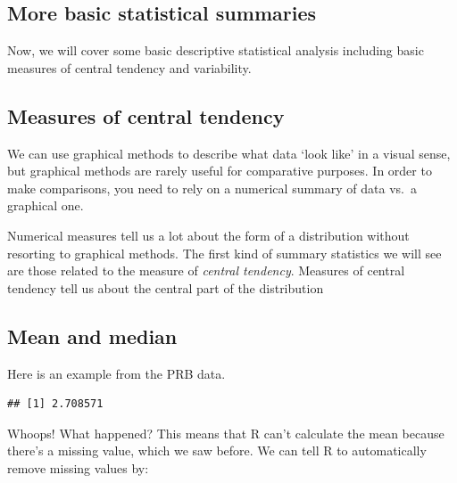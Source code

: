 \documentclass[
]{book}
\newenvironment{Shaded}{\begin{snugshade}}{\end{snugshade}}
\newcommand{\AttributeTok}[1]{\textcolor[rgb]{0.77,0.63,0.00}{#1}}
\newcommand{\ConstantTok}[1]{\textcolor[rgb]{0.00,0.00,0.00}{#1}}
\newcommand{\FunctionTok}[1]{\textcolor[rgb]{0.00,0.00,0.00}{#1}}
\newcommand{\NormalTok}[1]{#1}
\newcommand{\SpecialCharTok}[1]{\textcolor[rgb]{0.00,0.00,0.00}{#1}}
\begin{document}
\hypertarget{more-basic-statistical-summaries}{%
\subsection{More basic statistical summaries}\label{more-basic-statistical-summaries}}

Now, we will cover some basic descriptive statistical analysis including
basic measures of central tendency and variability.

\hypertarget{measures-of-central-tendency}{%
\subsection{Measures of central tendency}\label{measures-of-central-tendency}}

We can use graphical methods to describe what data `look like' in a
visual sense, but graphical methods are rarely useful for comparative
purposes. In order to make comparisons, you need to rely on a numerical
summary of data vs.~a graphical one.

Numerical measures tell us a lot about the form of a distribution
without resorting to graphical methods. The first kind of summary
statistics we will see are those related to the measure of \emph{central
tendency}. Measures of central tendency tell us about the central part
of the distribution

\hypertarget{mean-and-median}{%
\subsection{Mean and median}\label{mean-and-median}}

Here is an example from the PRB data.

\begin{Shaded}
\end{Shaded}

\begin{verbatim}
## [1] 2.708571
\end{verbatim}

Whoops! What happened? This means that R can't calculate the mean
because there's a missing value, which we saw before. We can tell R to
automatically remove missing values by:

\begin{Shaded}
\end{Shaded}
\end{document}
